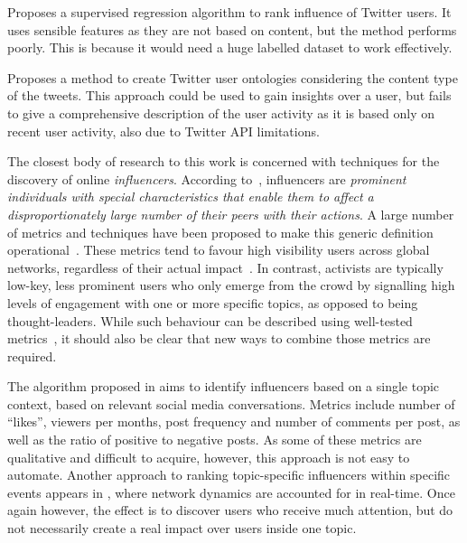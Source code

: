 
\cite{7569535} Proposes a supervised regression algorithm to rank influence of Twitter users. It uses sensible features as they are not based on content, but the method performs poorly. This is because it would need a huge labelled dataset to work effectively.

\cite{6978961}Proposes a method to create Twitter user ontologies considering the content type of the tweets. This approach could be used to gain insights over a user, but fails to give a comprehensive description of the user activity as it is based only on recent user activity, also due to Twitter API limitations.



The closest body of research to this work is concerned with techniques for the discovery of online \textit{influencers}. 
According to~\cite{Kardara2015}, influencers are \textit{prominent individuals with special characteristics that enable them to	affect a disproportionately large number of their peers with their actions}.
%
A large number of metrics and techniques have been proposed to make this generic definition operational~\cite{RIQUELME2016949}. 
%
These metrics tend to favour high visibility users across global networks, regardless of their actual impact~\cite{Cha2010MeasuringUI}. 
%
In contrast, activists are typically low-key, less prominent users who only emerge from the crowd by signalling high levels of engagement with one or more specific topics, as opposed to being thought-leaders. 
%
While such behaviour can be described  using well-tested metrics~\cite{RIQUELME2016949}, it should also be clear that new ways to combine those metrics are required.

The algorithm proposed in \cite{MATIC2011} aims to identify influencers based on a single topic context, based on relevant social media conversations.
Metrics include number of ``likes'', viewers per months, post frequency and  number of comments per post, as well as the ratio of positive to negative posts.
As some of these metrics are qualitative and difficult to acquire, however, this approach is not easy to automate.
%
Another approach to ranking topic-specific influencers within specific events appears in  \cite{Kardara2015}, where network dynamics are accounted for in real-time.
Once again however, the effect is to discover users who receive much attention, but do not necessarily create a real impact over users inside one topic.

